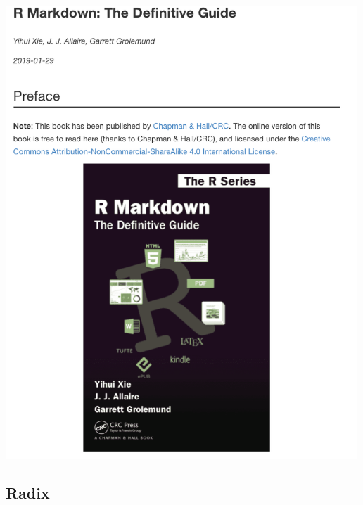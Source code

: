 \documentclass[]{article}
\begin{document}
\includegraphics[width=5.20833in,height=\textheight]{../figures/rmarkdown.png}

\hypertarget{radix}{%
\subsection{Radix}\label{radix}}
\end{document}
